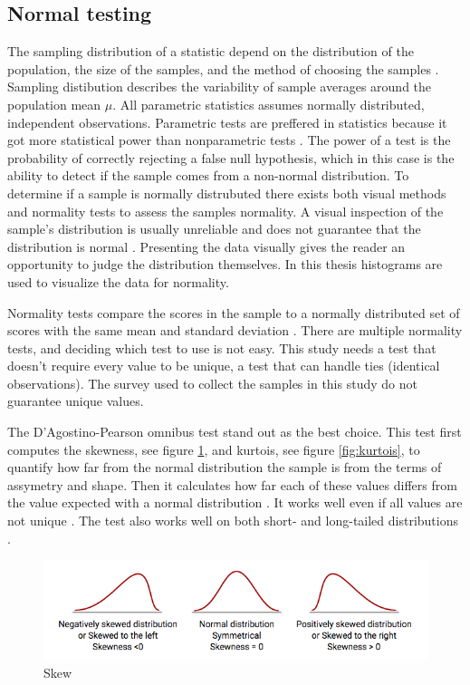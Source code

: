 \subsection{Normal testing}\label{subsec:normaltesting}
The sampling distribution of a statistic depend on the distribution of the population, the size of the samples, and the method of choosing the samples \citep{Walpole2012}. Sampling distibution describes the variability of sample averages around the population mean $\mu$. All parametric statistics assumes normally distributed, independent observations. Parametric tests are preffered in statistics because it got more statistical power than nonparametric tests \citep{Frost2015}. The power of a test is the probability of correctly rejecting a false null hypothesis, which in this case is the ability to detect if the sample comes from a non-normal distribution. To determine if a sample is normally distrubuted there exists both visual methods and normality tests to assess the samples normality. A visual inspection of the sample's distribution is usually unreliable and does not guarantee that the distribution is normal \citep{Pearson2006}. Presenting the data visually gives the reader an opportunity to judge the distribution themselves. In this thesis histograms are used to visualize the data for normality. 

Normality tests compare the scores in the sample to a normally distributed set of scores with the same mean and standard deviation \citep{Ghasemi2012}. There are multiple normality tests, and deciding which test to use is not easy. This study needs a test that doesn't require every value to be unique, a test that can handle ties (identical observations). The survey used to collect the samples in this study do not guarantee unique values. 

The D'Agostino-Pearson omnibus test stand out as the best choice. This test first computes the skewness, see figure \ref{fig:skew}, and kurtois, see figure \ref{fig:kurtois}, to quantify how far from the normal distribution the sample is from the terms of assymetry and shape. Then it calculates how far each of these values differs from the value expected with a normal distribution \citep{Pearson2006}. It works well even if all values are not unique \citep{Motulsky2013}. The test also works well on both short- and long-tailed distributions \citep{Yap2011}. \newline  %

\begin{figure}[h!]
	\centering
	\includegraphics[width=0.7\linewidth]{"fig/skew"}
	\caption{Skew \citep{MedCalcSoftwarebvba2017}}
	\label{fig:skew}
\end{figure}

